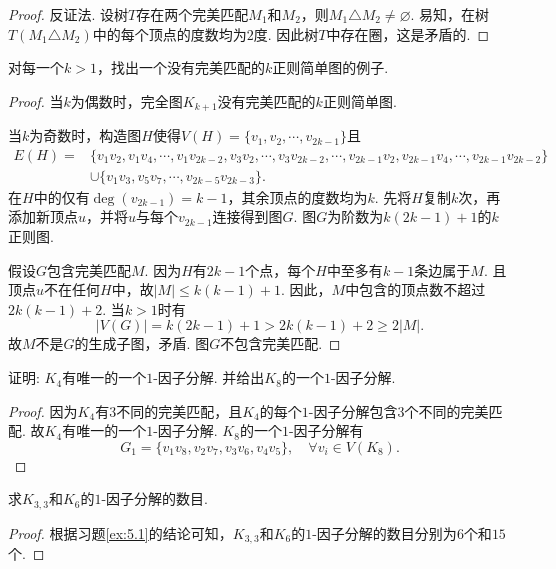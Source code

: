 \documentclass[cn,blue,normal,founder,11pt]{elegantnote}
\begin{document}
\begin{proof}
反证法. 设树\(T\)存在两个完美匹配\(M_1\)和\(M_2\)，则\(M_1\triangle M_2\ne\varnothing\). 易知，在树\(T(M_1\triangle M_2)\)中的每个顶点的度数均为\(2\)度. 因此树\(T\)中存在圈，这是矛盾的.
\end{proof}

\begin{example}
对每一个\(k>1\)，找出一个没有完美匹配的\(k\)正则简单图的例子.
\end{example}

\begin{proof}
当\(k\)为偶数时，完全图\(K_{k+1}\)没有完美匹配的\(k\)正则简单图.

当\(k\)为奇数时，构造图\(H\)使得\(V(H)=\{v_1,v_2,\cdots,v_{2k-1}\}\)且
\begin{align*}
E(H)=&\{v_1v_2,v_1v_4,\cdots,v_1v_{2k-2},v_3v_2,\cdots,v_3v_{2k-2},\cdots,v_{2k-1}v_2,v_{2k-1}v_4,\cdots,v_{2k-1}v_{2k-2}\}\\
&\cup\{v_1v_3,v_5v_7,\cdots,v_{2k-5}v_{2k-3}\}.
\end{align*}
在\(H\)中的仅有\(\deg(v_{2k-1})=k-1\)，其余顶点的度数均为\(k\). 先将\(H\)复制\(k\)次，再添加新顶点\(u\)，并将\(u\)与每个\(v_{2k-1}\)连接得到图\(G\). 图\(G\)为阶数为\(k(2k-1)+1\)的\(k\)正则图.

假设\(G\)包含完美匹配\(M\). 因为\(H\)有\(2k-1\)个点，每个\(H\)中至多有\(k-1\)条边属于\(M\). 且顶点\(u\)不在任何\(H\)中，故\(|M|\leqslant k(k-1)+1\). 因此，\(M\)中包含的顶点数不超过\(2k(k-1)+2\). 当\(k>1\)时有
\[|V(G)|=k(2k-1)+1>2k(k-1)+2\geqslant 2|M|.\]
故\(M\)不是\(G\)的生成子图，矛盾. 图\(G\)不包含完美匹配.
\end{proof}

\begin{example}
证明: \(K_4\)有唯一的一个\(1\)-因子分解. 并给出\(K_8\)的一个\(1\)-因子分解.
\end{example}

\begin{proof}
因为\(K_4\)有\(3\)不同的完美匹配，且\(K_4\)的每个\(1\)-因子分解包含\(3\)个不同的完美匹配. 故\(K_4\)有唯一的一个\(1\)-因子分解. \(K_8\)的一个\(1\)-因子分解有
\[G_1=\{v_1 v_8,v_2 v_7,v_3 v_6,v_4 v_5\},\quad\forall v_i\in V(K_8).\]
\end{proof}

\begin{example}
求\(K_{3,3}\)和\(K_6\)的\(1\)-因子分解的数目.
\end{example}

\begin{proof}
根据习题\ref{ex:5.1}的结论可知，\(K_{3,3}\)和\(K_6\)的\(1\)-因子分解的数目分别为\(6\)个和\(15\)个.
\end{proof}
\end{document}
